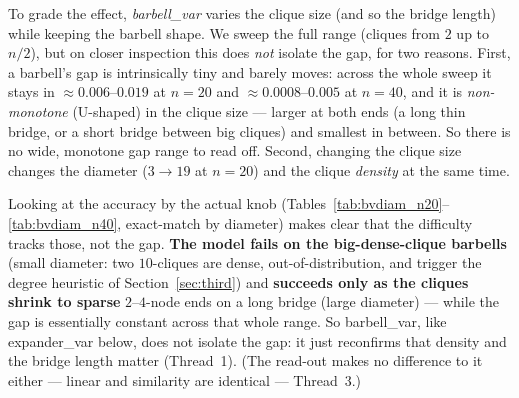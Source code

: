 \documentclass[11pt,a4paper]{article}
\begin{document}
To grade the effect, \emph{barbell\_var} varies the clique size (and so the bridge length) while
keeping the barbell shape. We sweep the full range (cliques from $2$ up to $n/2$), but on closer
inspection this does \emph{not} isolate the gap, for two reasons. First, a barbell's gap is
intrinsically tiny and barely moves: across the whole sweep it stays in $\approx0.006$--$0.019$
at $n=20$ and $\approx0.0008$--$0.005$ at $n=40$, and it is \emph{non-monotone} (U-shaped) in the
clique size --- larger at both ends (a long thin bridge, or a short bridge between big cliques)
and smallest in between. So there is no wide, monotone gap range to read off. Second, changing
the clique size changes the diameter ($3\to19$ at $n=20$) and the clique \emph{density} at the
same time.

Looking at the accuracy by the actual knob (Tables~\ref{tab:bvdiam_n20}--\ref{tab:bvdiam_n40},
exact-match by diameter) makes clear that the difficulty tracks those, not the gap. \textbf{The model
fails on the big-dense-clique barbells} (small diameter: two $10$-cliques are dense,
out-of-distribution, and trigger the degree heuristic of Section~\ref{sec:third}) and  \textbf{succeeds
only as the cliques shrink to sparse} $2$--$4$-node ends on a long bridge (large diameter) ---
while the gap is essentially constant across that whole range. So barbell\_var, like
expander\_var below, does not isolate the gap: it just reconfirms that density and the bridge
length matter (Thread~1). (The read-out makes no difference to it either --- linear and
similarity are identical --- Thread~3.)
\end{document}
